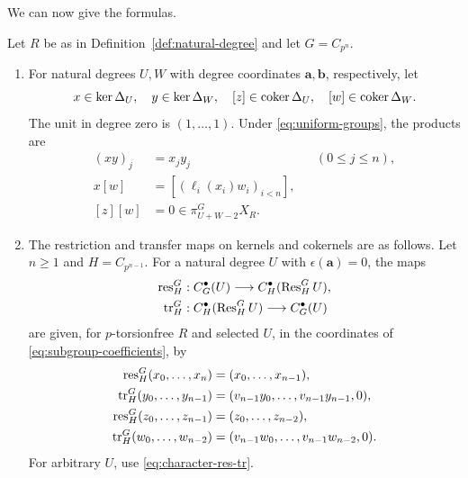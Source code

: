 We can now give the formulas.

\begin{proposition}\label{prop:products-maps}\label{lem:path-products}
Let $R$ be as in Definition~\ref{def:natural-degree} and
let $G=C_{p^n}$.

\begin{enumerate}[label=\textup{(\arabic*)},leftmargin=*]
\item For natural degrees $U,W$ with degree coordinates
$\mathbf a,\mathbf b$, respectively, let
\[
x\in\ker\Delta_U,\quad y\in\ker\Delta_W,\quad
[z]\in\operatorname{coker}\Delta_U,\quad [w]\in\operatorname{coker}\Delta_W.
\]
The unit in degree zero is $(1,\ldots,1)$.
Under \eqref{eq:uniform-groups}, the products are
\begin{equation}\label{eq:path-cup}
\begin{aligned}
(xy)_j&=x_jy_j &&(0\le j\le n),\\
x[w]&=[(\ell_i(x_i)w_i)_{i<n}],\\
[z][w]&=0\in\pi_{U+W-2}^G X_R.
\end{aligned}
\end{equation}

\item The restriction and transfer maps on kernels and cokernels are as follows.
Let $n\ge1$ and $H=C_{p^{n-1}}$. For a natural degree $U$
with $\epsilon(\mathbf a)=0$, the maps
\[
\begin{aligned}
\operatorname{res}_H^G&:C_G^\bullet(U)\longrightarrow C_H^\bullet(\operatorname{Res}_H^G U),\\
\operatorname{tr}_H^G&:C_H^\bullet(\operatorname{Res}_H^G U)\longrightarrow C_G^\bullet(U)
\end{aligned}
\]
are given, for $p$-torsionfree $R$ and selected $U$, in the
coordinates of \eqref{eq:subgroup-coefficients}, by
\begin{equation}\label{eq:adjacent-res-tr}
\begin{aligned}
\operatorname{res}_H^G(x_0,\ldots,x_n)&=( x_0,\ldots, x_{n-1}),\\
\operatorname{tr}_H^G(y_0,\ldots,y_{n-1})&=(v_{n-1}y_0,\ldots,v_{n-1}y_{n-1},0),\\
\operatorname{res}_H^G(z_0,\ldots,z_{n-1})&=( z_0,\ldots, z_{n-2}),\\
\operatorname{tr}_H^G(w_0,\ldots,w_{n-2})&=(v_{n-1}w_0,\ldots,v_{n-1}w_{n-2},0).
\end{aligned}
\end{equation}
For arbitrary $U$, use \eqref{eq:character-res-tr}.


\end{enumerate}
\end{proposition}
